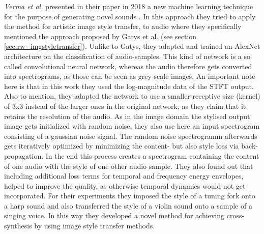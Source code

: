 \textit{Verma et al.} presented in their paper in 2018 a new machine learning technique for the purpose of generating novel sounds \cite{verma2018neural}. In this approach they tried to apply the method for artistic image style transfer, to audio where they specifically mentioned the approach proposed by Gatys et al.\cite{Gatys2016} (see section \ref{sec:rw_imgstyletransfer}). Unlike to Gatys, they adapted and trained an AlexNet architecture on the classification of audio-samples. This kind of network is a so called convolutional neural network, whereas the audio therefore gets converted into spectrograms, as those can be seen as grey-scale images. An important note here is that in this work they used the log-magnitude data of the STFT output. Also to mention, they adapted the network to use a smaller receptive size (kernel) of 3x3 instead of the larger ones in the original network, as they claim that it retains the resolution of the audio. As in the image domain the stylised output image gets initialized with random noise, they also use here an input spectrogram consisting of a gaussian noise signal. The random noise spectrogramm afterwards gets iteratively optimized by minimizing the content- but also style loss via back-propagation. In the end this process creates a spectrogram containing the content of one audio with the style of one other audio sample. They also found out that including additional loss terms for temporal and frequency energy envelopes, helped to improve the quality, as otherwise temporal dynamics would not get incorporated. For their experiments they imposed the style of a tuning fork onto a harp sound and also transferred the style of a violin sound onto a sample of a singing voice. In this way they developed a novel method for achieving cross-synthesis by using image style transfer methods.\\

